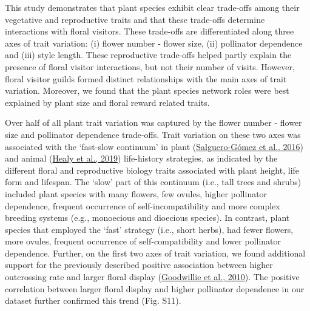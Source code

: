 \documentclass[
  12pt,
  a4paper,
]{article}
\begin{document}
This study demonstrates that plant species exhibit clear trade-offs among their vegetative and reproductive traits and that these trade-offs determine interactions with floral visitors. These trade-offs are differentiated along three axes of trait variation: (i) flower number - flower size, (ii) pollinator dependence and (iii) style length. These reproductive trade-offs helped partly explain the presence of floral visitor interactions, but not their number of visits. However, floral visitor guilds formed distinct relationships with the main axes of trait variation. Moreover, we found that the plant species network roles were best explained by plant size and floral reward related traits.

Over half of all plant trait variation was captured by the flower number - flower size and pollinator dependence trade-offs. Trait variation on these two axes was associated with the `fast-slow continuum' in plant (\protect\hyperlink{ref-salguero2016}{Salguero-Gómez et al., 2016}) and animal (\protect\hyperlink{ref-healy2019}{Healy et al., 2019}) life-history strategies, as indicated by the different floral and reproductive biology traits associated with plant height, life form and lifespan. The `slow' part of this continuum (i.e., tall trees and shrubs) included plant species with many flowers, few ovules, higher pollinator dependence, frequent occurrence of self-incompatibility and more complex breeding systems (e.g., monoecious and dioecious species). In contrast, plant species that employed the `fast' strategy (i.e., short herbs), had fewer flowers, more ovules, frequent occurrence of self-compatibility and lower pollinator dependence. Further, on the first two axes of trait variation, we found additional support for the previously described positive association between higher outcrossing rate and larger floral display (\protect\hyperlink{ref-goodwillie2010}{Goodwillie et al., 2010}). The positive correlation between larger floral display and higher pollinator dependence in our dataset further confirmed this trend (Fig. S11).
\end{document}
